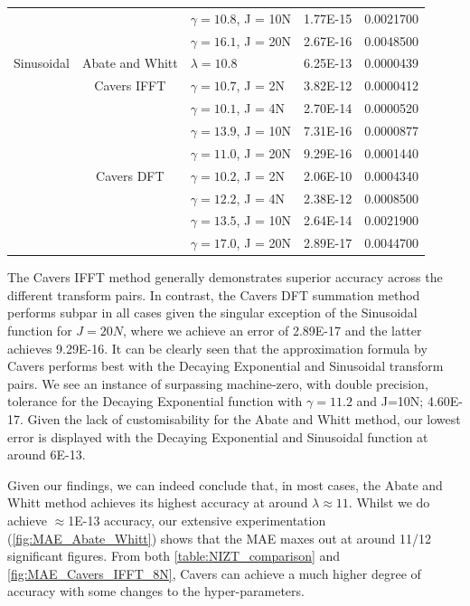 \documentclass[a4paper]{report}
\begin{document}
\begin{longtable}{c|c|l|l|l}
    & & $\gamma = 10.8$, J = 10N & 1.77E-15 & 0.0021700 \\
    & & $\gamma = 16.1$, J = 20N & 2.67E-16 & 0.0048500 \\
    \hline
    Sinusoidal & Abate and Whitt & $\lambda = 10.8$ & 6.25E-13 & 0.0000439 \\
    & Cavers IFFT & $\gamma = 10.7$, J = 2N & 3.82E-12 & 0.0000412 \\
    & & $\gamma = 10.1$, J = 4N & 2.70E-14 & 0.0000520 \\
    & & $\gamma = 13.9$, J = 10N & 7.31E-16 & 0.0000877 \\
    & & $\gamma = 11.0$, J = 20N & 9.29E-16 & 0.0001440 \\
    & Cavers DFT & $\gamma = 10.2$, J = 2N & 2.06E-10 & 0.0004340 \\
    & & $\gamma = 12.2$, J = 4N & 2.38E-12 & 0.0008500 \\
    & & $\gamma = 13.5$, J = 10N & 2.64E-14 & 0.0021900 \\
    & & $\gamma = 17.0$, J = 20N & 2.89E-17 & 0.0044700 \\
\end{longtable}

The Cavers IFFT method generally demonstrates superior accuracy across the different transform pairs. In contrast, the Cavers DFT summation method performs subpar in all cases given the singular exception of the Sinusoidal function for $J=20N$, where we achieve an error of 2.89E-17 and the latter achieves 9.29E-16. It can be clearly seen that the approximation formula by Cavers performs best with the Decaying Exponential and Sinusoidal transform pairs. We see an instance of surpassing machine-zero, with double precision, tolerance for the Decaying Exponential function with $\gamma = 11.2$ and J=10N; 4.60E-17. Given the lack of customisability for the Abate and Whitt method, our lowest error is displayed with the Decaying Exponential and Sinusoidal function at around 6E-13.

Given our findings, we can indeed conclude that, in most cases, the Abate and Whitt method achieves its highest accuracy at around $\lambda \approx 11$. Whilst we do achieve $\approx$1E-13 accuracy, our extensive experimentation (\autoref{fig:MAE_Abate_Whitt}) shows that the MAE maxes out at around 11/12 significant figures. From both \autoref{table:NIZT_comparison} and \autoref{fig:MAE_Cavers_IFFT_8N}, Cavers can achieve a much higher degree of accuracy with some changes to the hyper-parameters. 
\end{document}
